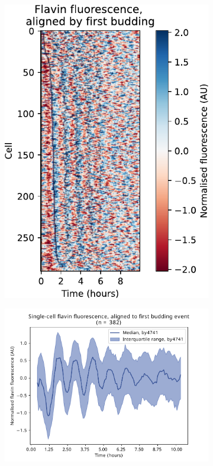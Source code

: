 \begin{figure}
  \begin{subfigure}[htpb]{0.45\textwidth}
   \centering
   \includegraphics[width=\textwidth]{by4741_491_7.pdf}
   \caption{
   }
   \label{fig:biology-by4741-sync-heatmap}
  \end{subfigure}%
  \begin{subfigure}[htpb]{0.45\textwidth}
   \centering
   \includegraphics[width=\textwidth]{by4741_491_6}
   \caption{
   }
   \label{fig:biology-by4741-sync-median}
  \end{subfigure}


\end{figure}
